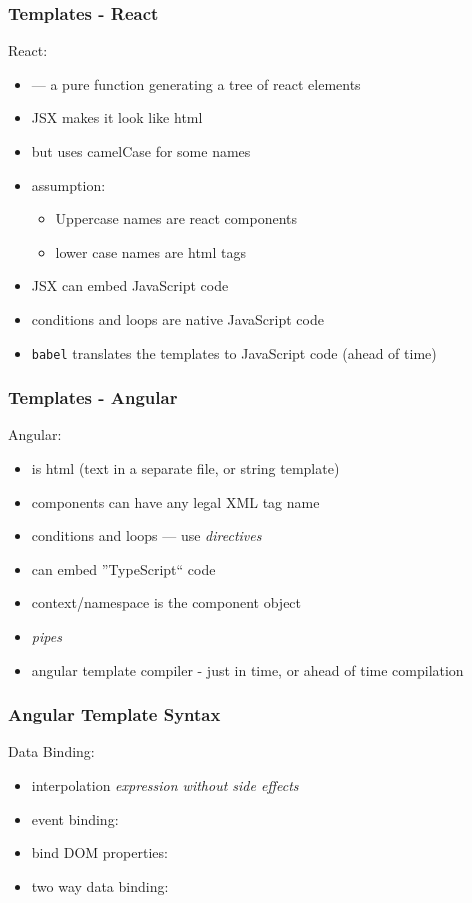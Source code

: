 \begin{frame}[fragile] \frametitle{Templates - React}

React:
\begin{itemize}
  \item {} --- a pure function generating a tree of react elements
  \item JSX makes it look like html
  \item but uses camelCase for some names
  \item assumption:
  \begin{itemize}
    \item Uppercase names are react components
    \item lower case names are html tags
  \end{itemize}
  \item JSX can embed JavaScript code
  \item conditions and loops are native JavaScript code
  \item {\tt babel} translates the templates to JavaScript code (ahead of time)
\end{itemize}
\end{frame}

\begin{frame}[fragile] \frametitle{Templates - Angular}
Angular:
\begin{itemize}
  \item is html (text in a separate file, or string template)
  \item components can have any legal XML tag name
  \item conditions and loops --- use \emph{directives}
  \item can embed ''TypeScript`` code
  \item context/namespace is the component object
  \item \emph{pipes}
  \item angular template compiler - just in time, or ahead of time compilation
\end{itemize}
\end{frame}

\begin{frame}[fragile] \frametitle{Angular Template Syntax}
Data Binding:
\begin{itemize}
  \item interpolation  \emph{expression without side effects} 
  \item event binding: 
  \item bind DOM properties: 
  \item two way data binding: 
\end{itemize}
\end{frame}

